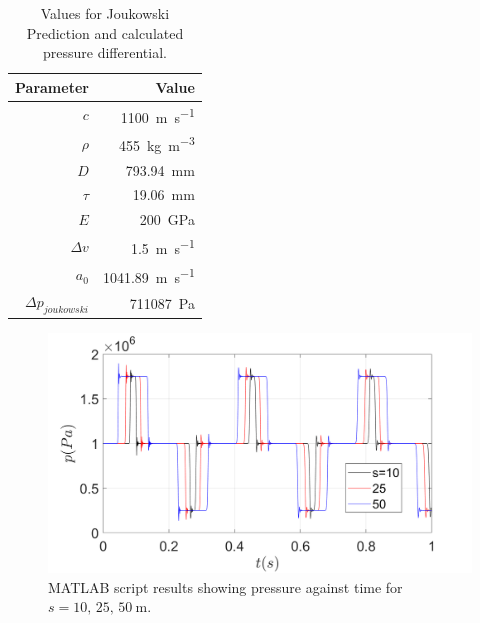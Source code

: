 \begin{table}[H]
    \centering
    \begin{tabular}{@{}rr@{}}
        \toprule
        \textbf{Parameter}     & \textbf{Value}                       \\
        \midrule
        $c$                    & \SI{1100}{\meter\per\second}         \\
        $\rho$                 & \SI{455}{\kilo\gram\per\meter\cubed} \\
        $D$                    & \SI{793.94}{\milli\meter}            \\
        $\tau$                 & \SI{19.06}{\milli\meter}             \\
        $E$                    & \SI{200}{\giga\pascal}               \\
        $\Delta v$             & \SI{1.5}{\meter\per\second}          \\
        $a_0$                  & \SI{1041.89}{\meter\per\second}      \\
        $\Delta p_{joukowski}$ & \SI{711087}{\pascal}                 \\
        \bottomrule
    \end{tabular}
    \caption{Values for Joukowski Prediction and calculated pressure differential.}
    \label{matlabScriptVals}
\end{table}

\begin{figure}[H]
    \centering
    \includegraphics[width = 0.9 \textwidth]{img/fig1.png}
    \caption{MATLAB script results showing pressure against time for $s=10,\,25,\,\SI{50}{\meter}$.}
    \label{pressure1}
\end{figure}

